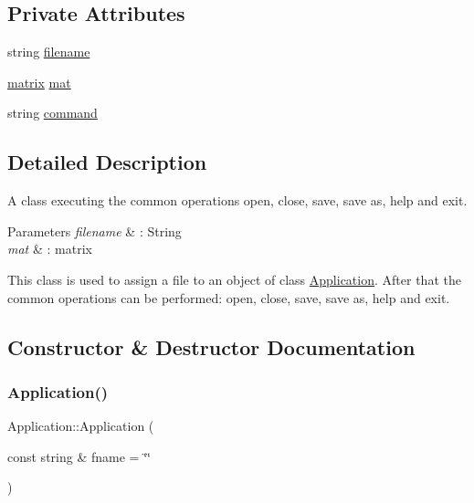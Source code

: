 \subsection*{Private Attributes}
\begin{DoxyCompactItemize}
\item 
string \hyperlink{class_application_a3a20c3178562a91be951369d3356aabd}{filename}
\item 
\hyperlink{formula_8h_a869e2a5deeb3daa4c82d6bc91cf20d92}{matrix} \hyperlink{class_application_ae126cc1a7d1f29ad485ddd285dadf3a3}{mat}
\item 
string \hyperlink{class_application_acffe56e592fb525ce14ad0437c2c3d34}{command}
\end{DoxyCompactItemize}


\subsection{Detailed Description}
A class executing the common operations open, close, save, save as, help and exit. 


\begin{DoxyParams}{Parameters}
{\em filename} & \+: String \\
\hline
{\em mat} & \+: matrix\\
\hline
\end{DoxyParams}
This class is used to assign a file to an object of class \hyperlink{class_application}{Application}. After that the common operations can be performed\+: open, close, save, save as, help and exit. 

\subsection{Constructor \& Destructor Documentation}
\mbox{\label{class_application_ade4650e7378dae1d94794b86995fd571}} 
\subsubsection{\texorpdfstring{Application()}{Application()}}
{\footnotesize\ttfamily Application\+::\+Application (\begin{DoxyParamCaption}\item[{const string \&}]{fname = {\ttfamily \char`\"{}\char`\"{}} }\end{DoxyParamCaption})\hspace{0.3cm}{\ttfamily [explicit]}}

